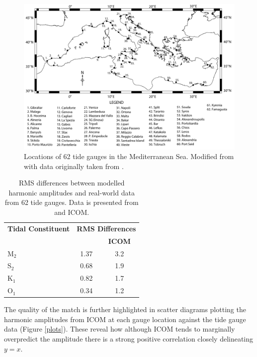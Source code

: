 \begin{figure}[htbp]
\centering
\includegraphics[width=\textwidth]{./examples_images/tides_in_the_Mediterranean_Sea/gauges.pdf}
\caption{Locations of 62 tide gauges in the Mediterranean Sea. Modified from \citet{Wells2008} with data originally taken from 
\citet{Tsimplis1995}. }
\label{gauge}
\end{figure}

\begin{table}[htbp]
\centering
\begin{tabular}{l c c}
\hline
\bf{Tidal Constituent} & \multicolumn{2}{c}{\bf{RMS Differences}} \\
\cline{2-3}
& \bf{\citet{Tsimplis1995}} & \bf{ICOM} \\
\hline
M$_{\text{2}}$ &1.37 & 3.2\\
S$_{\text{2}}$ &0.68 & 1.9\\
K$_{\text{1}}$ &0.82 & 1.7\\
O$_{\text{1}}$ &0.34 & 1.2\\
\hline
\end{tabular}
\caption{RMS differences between modelled harmonic amplitudes and real-world data from 62 tide gauges.
Data is presented from \citet{Tsimplis1995} and ICOM. }
\label{rms}
\end{table}

The quality of the match is further highlighted in scatter diagrams plotting 
the harmonic amplitudes from ICOM at each gauge location against the tide gauge data (Figure \ref{plots}).
These reveal how although ICOM tends to marginally overpredict the amplitude there is a strong
positive correlation closely delineating $y=x$. 

